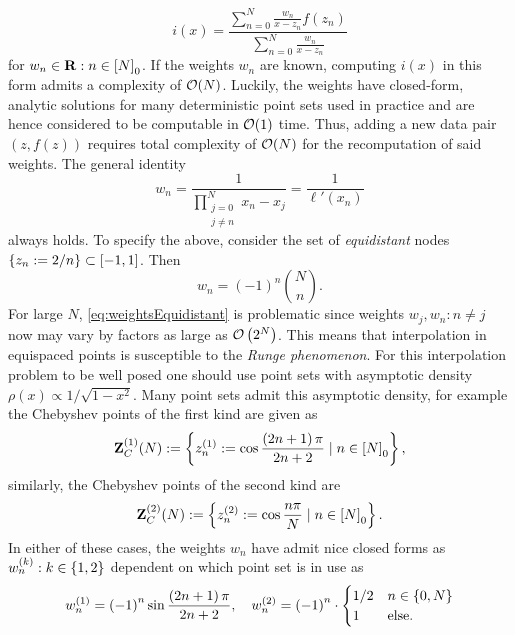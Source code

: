 \documentclass[12pt, oneside]{amsart}
\theoremstyle{definition}
\theoremstyle{remark}
\numberwithin{equation}{section}
\begin{document}
\begin{equation}\label{eq:barycentricLagrange}
    i(x) = \frac{\sum_{n=0}^N \frac{w_n}{x-z_n} f(z_n)}{\sum_{n=0}^N \frac{w_n}{x-z_n}}
\end{equation}
for \(w_n \in \mathbf{R} : n \in {[N]}_0\). If the weights \(w_n\) are known, computing \(i(x)\) in this form admits a complexity of \(\mathcal{O}(N)\). Luckily, the weights have closed-form, analytic solutions for many deterministic point sets used in practice and are hence considered to be computable in \(\mathcal{O}(1)\) time. Thus, adding a new data pair \((z, f(z))\) requires total complexity of \(\mathcal{O}(N)\) for the recomputation of said weights. The general identity \[
    w_n = \frac{1}{\prod_{\substack{j=0\\j \neq n}}^N x_n - x_j} = \frac{1}{\ell'(x_n)}
\]
always holds. To specify the above, consider the set of \emph{equidistant} nodes \(\left\{z_n := 2/n\right\} \subset [-1, 1]\). Then \begin{equation}\label{eq:weightsEquidistant}
    w_n = {\left(-1\right)}^n {N \choose n}.
\end{equation}
For large \(N\), \cref{eq:weightsEquidistant} is problematic since weights \(w_j, w_n: n \neq j\) now may vary by factors as large as \(\mathcal{O}\left(2^N\right)\). This means that interpolation in equispaced points is susceptible to the \emph{Runge phenomenon}. For this interpolation problem to be well posed one should use point sets with asymptotic density \(\rho(x) \propto 1/\sqrt{1-x^2}\). Many point sets admit this asymptotic density, for example the Chebyshev points of the first kind are given as
\begin{equation}\label{eq:Clenshaw}
    \mathbf{Z}_C^{(1)}(N) := \left\{z^{(1)}_n := \cos \frac{\left(2n+1\right) \pi}{2n+2} \mid n \in {[N]}_0\right\},
\end{equation}
similarly, the Chebyshev points of the second kind are
\begin{equation}
    \mathbf{Z}_C^{(2)}(N) := \left\{z^{(2)}_n := \cos \frac{n\pi}{N} \mid n \in {[N]}_0\right\}.
\end{equation}
In either of these cases, the weights \(w_n\) have admit nice closed forms as \(w_n^{(k)}: k \in \left\{1,2\right\}\) dependent on which point set is in use as
\begin{equation}\label{eq:weightsChebyshev}
    w_n^{(1)} = {\left(-1\right)}^n \sin \frac{\left(2n+1\right) \pi}{2n+2}, \quad w_n^{(2)} = {\left(-1\right)}^n \cdot \begin{cases}
        1/2 &n \in \left\{0, N\right\}\\
        1 &\text{else.}
    \end{cases}
\end{equation}
\end{document}
